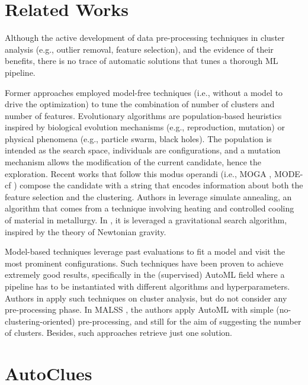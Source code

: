 \section{Related Works}\label{clustering-sec:related}

Although the active development of data pre-processing techniques in cluster analysis (e.g., outlier removal, feature selection), and the evidence of their benefits, there is no trace of automatic solutions that tunes a thorough ML pipeline.

Former approaches employed model-free techniques (i.e., without a model to drive the optimization) to tune the combination of number of clusters and number of features.
Evolutionary algorithms are population-based heuristics inspired by biological evolution mechanisms (e.g., reproduction, mutation) or physical phenomena (e.g., particle swarm, black holes).
The population is intended as the search space, individuals are configurations, and a mutation mechanism allows the modification of the current candidate, hence the exploration.
Recent works that follow this modus operandi (i.e., MOGA \cite{dutta2013}, MODE-cf \cite{hancer2020new}) compose the candidate with a string that encodes information about both the feature selection and the clustering.
Authors in \cite{simulate_annealing} leverage simulate annealing, an algorithm that comes from a technique involving heating and controlled cooling of material in metallurgy.
In \cite{prakash2019gravitational}, it is leveraged a gravitational search algorithm, inspired by the theory of Newtonian gravity.

Model-based techniques leverage past evaluations to fit a model and visit the most prominent configurations.
Such techniques have been proven to achieve extremely good results, specifically in the (supervised) AutoML field where a pipeline has to be instantiated with different algorithms and hyperparameters.
Authors in \cite{Tschechlov2021,poulakis2020autoclust,Liu2021} apply such techniques on cluster analysis, but do not consider any pre-processing phase.
In MALSS \cite{Kamoshida2020}, the authors apply AutoML with simple (no-clustering-oriented) pre-processing, and still for the aim of suggesting the number of clusters.
Besides, such approaches retrieve just one solution.

\section{AutoClues}\label{clustering-sec:autoclues}

